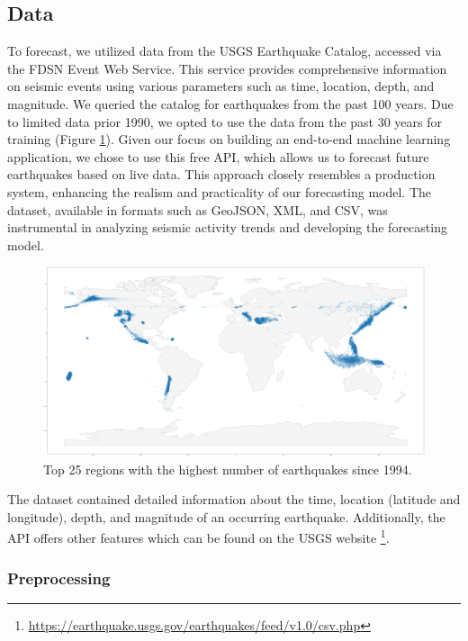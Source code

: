 \subsection{Data}
To forecast, we utilized data from the \ac{USGS} Earthquake Catalog, accessed via
the \ac{FDSN} Event Web Service. This service provides comprehensive information
on seismic events using various parameters such as time, location, depth, and magnitude.
We queried the catalog for earthquakes from the past 100 years. Due to
limited data prior 1990, we opted to use the data from the past 30 years
for training (Figure \ref{fig:world-map}). Given our focus on building an end-to-end machine learning
application, we chose to use this free API, which allows us to forecast
future earthquakes based on live data. This approach closely resembles a
production system, enhancing the realism and practicality of our forecasting
model. The dataset, available in formats such as GeoJSON, XML, and CSV, was
instrumental in analyzing seismic activity trends and developing the forecasting model.


\begin{figure}[hbtp]
  \centering
  \includegraphics[scale=0.13]{img/world-earthquakes-top-25-regions-past-30-years.png}
  \captionsetup{format=hang}
  \caption{\label{fig:world-map}Top 25 regions with the highest number of earthquakes since 1994.}
\end{figure}

The dataset contained detailed information about the time, location (latitude and longitude),
depth, and magnitude of an occurring earthquake. Additionally, the API offers
other features which can be found on the
\ac{USGS} website \footnote{\url{https://earthquake.usgs.gov/earthquakes/feed/v1.0/csv.php}}.

\subsubsection{Preprocessing}

